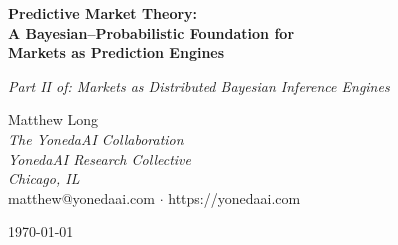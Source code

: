 \documentclass[12pt,a4paper]{article}
\theoremstyle{definition}
\begin{document}

\begin{center}
{\LARGE\bfseries Predictive Market Theory:\\[6pt]
A Bayesian--Probabilistic Foundation for\\[4pt]
Markets as Prediction Engines}

\vspace{0.5cm}

{\large\itshape Part II of: Markets as Distributed Bayesian Inference Engines}

\vspace{1.0cm}

{\large Matthew Long}\\[4pt]
{\itshape The YonedaAI Collaboration}\\
{\itshape YonedaAI Research Collective}\\
{\itshape Chicago, IL}\\[4pt]
{\ttfamily matthew@yonedaai.com} $\cdot$ {\ttfamily https://yonedaai.com}

\vspace{0.8cm}

\today

\vspace{0.6cm}

\end{center}
\end{document}
